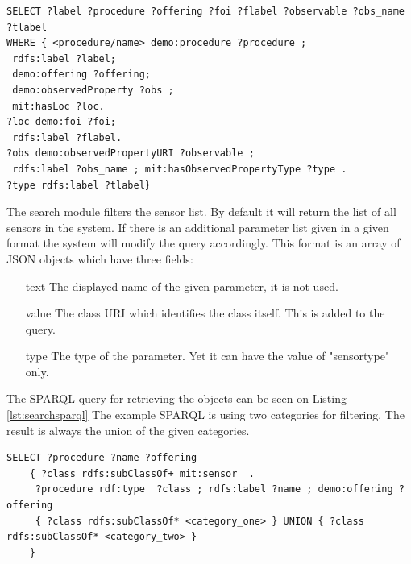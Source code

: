 \begin{lstlisting}[caption={SPARQL query for Capabilities\label{lst:capsparql}}]
SELECT ?label ?procedure ?offering ?foi ?flabel ?observable ?obs_name ?tlabel 
WHERE { <procedure/name> demo:procedure ?procedure ;
 rdfs:label ?label;
 demo:offering ?offering;
 demo:observedProperty ?obs ; 
 mit:hasLoc ?loc.
?loc demo:foi ?foi;
 rdfs:label ?flabel. 
?obs demo:observedPropertyURI ?observable ;
 rdfs:label ?obs_name ; mit:hasObservedPropertyType ?type .
?type rdfs:label ?tlabel}
\end{lstlisting}

The search module filters the sensor list. By default it will return the list of all sensors in the system. If there is an additional parameter list given in a given format the system will modify the query accordingly. This format is an array of  JSON objects which have three fields: 
\begin{itemize}
\item[text] The displayed name of the given parameter, it is not used.
\item[value] The class URI which identifies the class itself. This is added to the query.
\item[type] The type of the parameter. Yet it can have the value of "sensortype" only. 
\end{itemize}
The SPARQL query for retrieving the objects can be seen on Listing \ref{lst:searchsparql} The example SPARQL is using two categories for filtering. The result is always the union of the given categories. 

\begin{lstlisting}[caption={SPARQL query for Search\label{lst:searchsparql}}]
SELECT ?procedure ?name ?offering
    { ?class rdfs:subClassOf+ mit:sensor  .
     ?procedure rdf:type  ?class ; rdfs:label ?name ; demo:offering ?offering 
     { ?class rdfs:subClassOf* <category_one> } UNION { ?class rdfs:subClassOf* <category_two> }
    }
\end{lstlisting}



